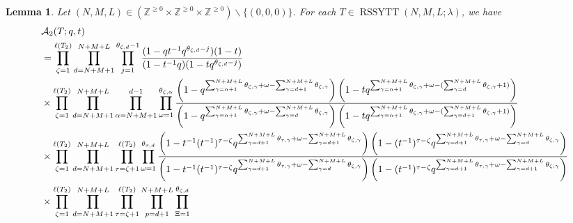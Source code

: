 \documentclass[12pt,reqno,a4paper]{amsart}
\newcommand{\cals}[1]{\mathcal{#1}}
\newcommand{\bb}[1]{\mathbb{#1}}
\numberwithin{equation}{section}
\newtheorem{lem}[thm]{Lemma}
\theoremstyle{definition}
\begin{document}
\begin{lem}
\label{prp317-2237-16aug}
Let $(N,M,L) \in (\bb{Z}^{\geq 0} \times \bb{Z}^{\geq 0} \times \bb{Z}^{\geq 0})\backslash\{(0,0,0)\}$. For each $T \in \operatorname{RSSYTT}(N,M,L;\lambda)$, we have 
\footnotesize
\begin{align}
	&\cals{A}_2(T;q,t)
	\label{eqn35-1146-17aug}
	\\
	&=\prod_{\zeta = 1}^{\ell(T_2)}
	\prod_{d = N+M+1}^{N+M+L}
	\prod_{j = 1}^{\theta_{\zeta,d} - 1}
	\frac{
		(1 - qt^{-1}q^{\theta_{\zeta,d} - j})(1 - t)
	}{
		(1 - t^{-1}q)(1 - tq^{\theta_{\zeta,d} - j})
	}
	\notag 
	\\
	&\times 
	\prod_{\zeta = 1}^{\ell(T_2)}
	\prod_{d = N+M+1}^{N+M+L}
	\prod_{\alpha = N+M+1}^{d - 1} 
	\prod_{\omega = 1}^{\theta_{\zeta,\alpha}}
	\frac{
		\left(	1 - q^{	\sum_{\gamma = \alpha + 1}^{N + M + L} \theta_{\zeta,\gamma}	+ \omega - \sum_{\gamma = d+1}^{N + M + L}\theta_{\zeta,\gamma} 		}			\right)
		\left(	1 - tq^{	\sum_{\gamma = \alpha + 1}^{N + M + L} \theta_{\zeta,\gamma}	+ \omega - (\sum_{\gamma = d}^{N + M + L}\theta_{\zeta,\gamma} 	+ 1 )	}		\right)
	}{
		\left(	1 - q^{	\sum_{\gamma = \alpha + 1}^{N + M + L} \theta_{\zeta,\gamma}	+ \omega - \sum_{\gamma = d}^{N + M + L}\theta_{\zeta,\gamma} 		}			\right)
		\left(	1 - 	tq^{	\sum_{\gamma = \alpha + 1}^{N + M + L} \theta_{\zeta,\gamma}	+ \omega - (\sum_{\gamma = d + 1}^{N + M + L}\theta_{\zeta,\gamma} 	+ 1 )	}			\right)
	}
	\notag 
	\\
	&\times
	\prod_{\zeta = 1}^{\ell(T_2)}
	\prod_{d = N+M+1}^{N+M+L} 
	\prod_{\tau = \zeta + 1}^{\ell(T_2)} 
	\prod_{\omega = 1}^{\theta_{\tau,d}}
	\frac{
		\left(		1 - t^{-1} (t^{-1})^{\tau - \zeta}	q^{	\sum_{\gamma = d+1}^{N + M + L}\theta_{\tau,\gamma}	+ \omega - 	\sum_{\gamma = d+ 1}^{N + M + L} \theta_{\zeta,\gamma}				}			\right)
		\left(
		1 - (t^{-1})^{\tau - \zeta}	q^{	\sum_{\gamma = d+1}^{N + M + L}\theta_{\tau,\gamma}	+ \omega - 	\sum_{\gamma = d}^{N + M + L} \theta_{\zeta,\gamma}				}		
		\right)
	}{
		\left(		1 - t^{-1} (t^{-1})^{\tau - \zeta}	q^{	\sum_{\gamma = d+1}^{N + M + L}\theta_{\tau,\gamma}	+ \omega - 	\sum_{\gamma = d}^{N + M + L} \theta_{\zeta,\gamma}				}			\right)
		\left(
		1 - (t^{-1})^{\tau - \zeta}	q^{	\sum_{\gamma = d+1}^{N + M + L}\theta_{\tau,\gamma}	+ \omega - 	\sum_{\gamma = d+1}^{N + M + L} \theta_{\zeta,\gamma}				}		
		\right)
	}
	\notag 
	\\
	&\times 
	\prod_{\zeta = 1}^{\ell(T_2)}
	\prod_{d = N+M+1}^{N+M+L}
	\prod_{\tau = \zeta + 1}^{\ell(T_2)}
	\prod_{p = d+1}^{N+M+L}
	\prod_{\Xi = 1}^{\theta_{\zeta,d}}

\end{align}
\end{lem}
\end{document}
